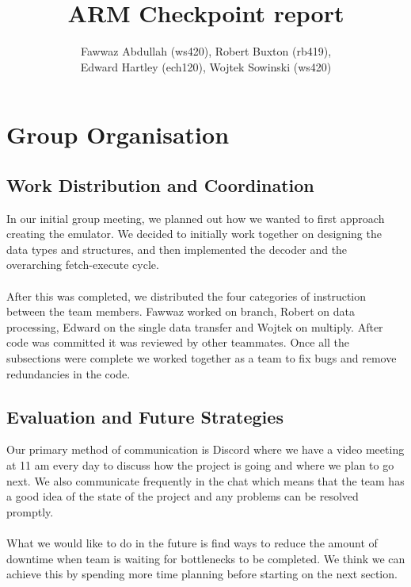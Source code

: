 \documentclass[11pt]{article}
\begin{document}
\title{ARM Checkpoint report}
\author{Fawwaz Abdullah (ws420), Robert Buxton (rb419), \\Edward Hartley (ech120), Wojtek Sowinski (ws420) }

\maketitle

\section{Group Organisation}

\subsection{Work Distribution and Coordination}

In our initial group meeting, we planned out how we wanted to first approach 
creating the emulator. We decided to initially work together on designing the 
data types and structures, and then implemented the decoder and the overarching 
fetch-execute cycle. \\ \\
After this was completed, we distributed the four categories
of instruction between the team members. Fawwaz worked on branch, Robert on data
processing, Edward on the single data transfer and Wojtek on multiply. After
code was committed it was reviewed by other teammates. Once all the subsections were complete we worked together as a team to fix bugs
and remove redundancies in the code. 

\subsection{Evaluation and Future Strategies}

Our primary method of communication is Discord where we have a video meeting at 
11 am every day to discuss how the project is going and where we plan to go next.
We also communicate frequently in the chat which means that the team has a good
idea of the state of the project and any problems can be resolved promptly. \\ \\
What we would like to do in the future is find ways to reduce the amount of 
downtime when team is waiting for bottlenecks to be completed. We think we can 
achieve this by spending more time planning before starting on the next section.
\end{document}
